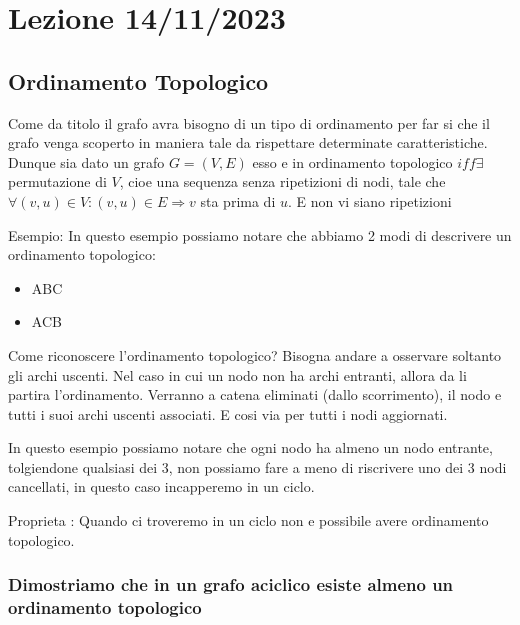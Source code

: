 \section{Lezione 14/11/2023}

\subsection{Ordinamento Topologico}
Come da titolo il grafo avra bisogno di un tipo di ordinamento per far si che il grafo venga scoperto in maniera tale da rispettare determinate caratteristiche.
Dunque sia dato un grafo $G = (V,E)$ esso e in ordinamento topologico $iff \exists$ permutazione di $V$, cioe una sequenza senza ripetizioni di nodi, tale che $\forall (v,u) \in V : (v,u) \in E \Rightarrow v$ sta prima di $u$. E non vi siano ripetizioni

Esempio:
	In questo esempio possiamo notare che abbiamo 2 modi di descrivere un ordinamento topologico:
	\begin{itemize}
		\item ABC 
		\item ACB 
	\end{itemize}
Come riconoscere l'ordinamento topologico?\newline
Bisogna andare a osservare soltanto gli archi uscenti. Nel caso in cui un nodo non ha archi entranti, allora da li partira l'ordinamento. Verranno a catena eliminati (dallo scorrimento), il nodo e tutti i suoi archi uscenti associati.
E cosi via per tutti i nodi aggiornati.


In questo esempio possiamo notare che ogni nodo ha almeno un nodo entrante, tolgiendone qualsiasi dei 3, non possiamo fare a meno di riscrivere uno dei 3 nodi cancellati, in questo caso incapperemo in un ciclo.

Proprieta : Quando ci troveremo in un ciclo non e possibile avere ordinamento topologico.


\subsubsection{Dimostriamo che in un grafo aciclico esiste almeno un ordinamento topologico}

